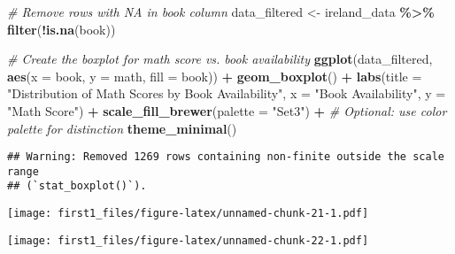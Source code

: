 \documentclass[
]{article}
\newenvironment{Shaded}{\begin{snugshade}}{\end{snugshade}}
\newcommand{\AttributeTok}[1]{\textcolor[rgb]{0.13,0.29,0.53}{#1}}
\newcommand{\CommentTok}[1]{\textcolor[rgb]{0.56,0.35,0.01}{\textit{#1}}}
\newcommand{\FunctionTok}[1]{\textcolor[rgb]{0.13,0.29,0.53}{\textbf{#1}}}
\newcommand{\NormalTok}[1]{#1}
\newcommand{\OtherTok}[1]{\textcolor[rgb]{0.56,0.35,0.01}{#1}}
\newcommand{\SpecialCharTok}[1]{\textcolor[rgb]{0.81,0.36,0.00}{\textbf{#1}}}
\newcommand{\StringTok}[1]{\textcolor[rgb]{0.31,0.60,0.02}{#1}}
\begin{document}
\begin{Shaded}
\begin{Highlighting}[]
\CommentTok{\# Remove rows with NA in \textquotesingle{}book\textquotesingle{} column}
\NormalTok{data\_filtered }\OtherTok{\textless{}{-}}\NormalTok{ ireland\_data }\SpecialCharTok{\%\textgreater{}\%} \FunctionTok{filter}\NormalTok{(}\SpecialCharTok{!}\FunctionTok{is.na}\NormalTok{(book))}

\CommentTok{\# Create the boxplot for math score vs. book availability}
\FunctionTok{ggplot}\NormalTok{(data\_filtered, }\FunctionTok{aes}\NormalTok{(}\AttributeTok{x =}\NormalTok{ book, }\AttributeTok{y =}\NormalTok{ math, }\AttributeTok{fill =}\NormalTok{ book)) }\SpecialCharTok{+}
  \FunctionTok{geom\_boxplot}\NormalTok{() }\SpecialCharTok{+}
  \FunctionTok{labs}\NormalTok{(}\AttributeTok{title =} \StringTok{"Distribution of Math Scores by Book Availability"}\NormalTok{,}
       \AttributeTok{x =} \StringTok{"Book Availability"}\NormalTok{,}
       \AttributeTok{y =} \StringTok{"Math Score"}\NormalTok{) }\SpecialCharTok{+}
  \FunctionTok{scale\_fill\_brewer}\NormalTok{(}\AttributeTok{palette =} \StringTok{"Set3"}\NormalTok{) }\SpecialCharTok{+}  \CommentTok{\# Optional: use color palette for distinction}
  \FunctionTok{theme\_minimal}\NormalTok{()}
\end{Highlighting}
\end{Shaded}

\begin{verbatim}
## Warning: Removed 1269 rows containing non-finite outside the scale range
## (`stat_boxplot()`).
\end{verbatim}

\texttt{[image: first1\_files/figure-latex/unnamed-chunk-21-1.pdf]}

\begin{Shaded}
\end{Shaded}

\texttt{[image: first1\_files/figure-latex/unnamed-chunk-22-1.pdf]}
\end{document}
